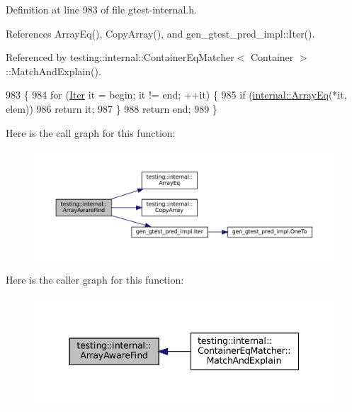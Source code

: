 Definition at line 983 of file gtest-\/internal.\+h.



References Array\+Eq(), Copy\+Array(), and gen\+\_\+gtest\+\_\+pred\+\_\+impl\+::\+Iter().



Referenced by testing\+::internal\+::\+Container\+Eq\+Matcher$<$ Container $>$\+::\+Match\+And\+Explain().


\begin{DoxyCode}
983                                                                \{
984   \textcolor{keywordflow}{for} (\hyperlink{namespacegen__gtest__pred__impl_ac016218b7c9437d1d5ac85c574c83069}{Iter} it = begin; it != end; ++it) \{
985     \textcolor{keywordflow}{if} (\hyperlink{namespacetesting_1_1internal_a5cb6f81ee827130024261121c742b26c}{internal::ArrayEq}(*it, elem))
986       \textcolor{keywordflow}{return} it;
987   \}
988   \textcolor{keywordflow}{return} end;
989 \}
\end{DoxyCode}
Here is the call graph for this function\+:
\nopagebreak
\begin{figure}[H]
\begin{center}
\leavevmode
\includegraphics[width=350pt]{namespacetesting_1_1internal_a94a857fe6ff32cf4fdc4769a4071f239_cgraph}
\end{center}
\end{figure}
Here is the caller graph for this function\+:
\nopagebreak
\begin{figure}[H]
\begin{center}
\leavevmode
\includegraphics[width=337pt]{namespacetesting_1_1internal_a94a857fe6ff32cf4fdc4769a4071f239_icgraph}
\end{center}
\end{figure}
\mbox{\label{namespacetesting_1_1internal_af4bebf36baf0b0a5b26d051dde55fa47}} 
